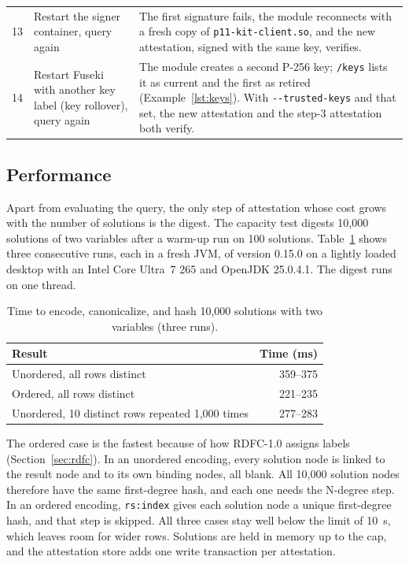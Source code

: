 \documentclass[11pt,a4paper]{article}
\newcommand{\code}[1]{\texttt{#1}}
\begin{document}
\begin{table}[htbp]
\begin{tabularx}{\linewidth}{@{}r>{\raggedright\arraybackslash}p{52mm}>{\raggedright\arraybackslash}X@{}}
13 & Restart the signer container, query again & The first signature fails, the module
reconnects with a fresh copy of \code{p11-kit-client.so}, and the new attestation, signed with
the same key, verifies. \\
14 & Restart Fuseki with another key label (key rollover), query again & The module creates a
second P-256 key; \code{/keys} lists it as current and the first as retired
(Example~\ref{lst:keys}). With \code{-{}-trusted-keys} and that set, the new attestation and
the step-3 attestation both verify. \\
\bottomrule
\end{tabularx}
\end{table}

\subsection{Performance}
\label{sec:perf}

Apart from evaluating the query, the only step of attestation whose cost grows with the
number of solutions is the digest. The capacity test digests 10,000 solutions of two variables
after a warm-up run on 100 solutions. Table~\ref{tab:perf} shows three consecutive runs, each
in a fresh JVM, of version 0.15.0 on a lightly loaded desktop with an Intel Core Ultra~7 265
and OpenJDK 25.0.4.1. The digest runs on one thread.

\begin{table}[ht]
\centering
\caption{Time to encode, canonicalize, and hash 10,000 solutions with two variables (three runs).}
\label{tab:perf}
\small
\begin{tabular}{@{}lr@{}}
\toprule
Result & Time (ms) \\
\midrule
Unordered, all rows distinct & 359--375 \\
Ordered, all rows distinct & 221--235 \\
Unordered, 10 distinct rows repeated 1,000 times & 277--283 \\
\bottomrule
\end{tabular}
\end{table}

The ordered case is the fastest because of how RDFC-1.0 assigns labels
(Section~\ref{sec:rdfc}). In an unordered encoding, every solution node is linked to the result
node and to its own binding nodes, all blank. All 10,000 solution nodes therefore have the same
first-degree hash, and each one needs the N-degree step. In an ordered encoding, \code{rs:index}
gives each solution node a unique first-degree hash, and that step is skipped. All three cases
stay well below the limit of 10~s, which leaves room for wider rows. Solutions are held in
memory up to the cap, and the attestation store adds one write transaction per attestation.
\end{document}
